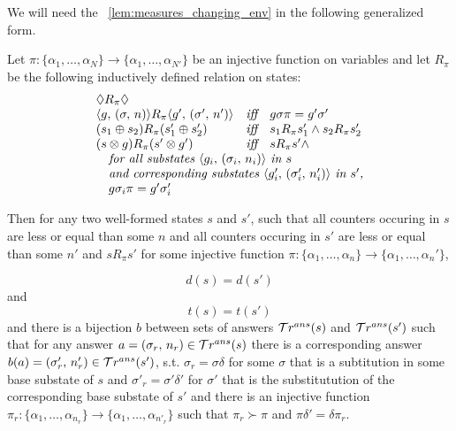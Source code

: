 


We will need the \lemmaword~\ref{lem:measures_changing_env} in the following generalized form.

\begin{lemma}
\label{lem:gen_measures_changing_env}
Let $\pi \colon \{ \alpha_1, \dots, \alpha_N \} \to \{ \alpha_1, \dots, \alpha_{N'} \}$ be an injective function on variables and let $R_{\pi}$ be the following inductively defined relation on states:
\[ \begin{array}{lcl}
\Diamond R_{\pi} \Diamond & & \\
\taskst{g}{\mkenv{\sigma}{n}} R_{\pi} \taskst{g'}{\mkenv{\sigma'}{n'}} & \textit{iff} & g \sigma \pi = g' \sigma' \\
(s_1 \oplus s_2) R_{\pi} (s'_1 \oplus s'_2) & \textit{iff} & s_1 R_{\pi} s'_1 \land s_2 R_{\pi} s'_2  \\
(s \otimes g) R_{\pi} (s' \otimes g') & \textit{iff} & s R_{\pi} s' \land \\
\multicolumn{3}{l}{\textit{\quad for all substates $\taskst{g_i}{\mkenv{\sigma_i}{n_i}}$ in $s$}}\\
\multicolumn{3}{l}{\textit{\quad and corresponding substates $\taskst{g'_i}{\mkenv{\sigma'_i}{n'_i}}$ in $s'$,}} \\
\multicolumn{3}{l}{\quad g \sigma_i \pi = g' \sigma'_i} \\
\end{array} \]

Then for any two well-formed states $s$ and $s'$, such that all counters occuring in $s$ are less or equal than some $n$ and all counters occuring in $s'$ are less or equal than some $n'$ and $s R_{\pi} s'$ for some injective function $\pi \colon \{ \alpha_1, \dots, \alpha_n \} \to \{ \alpha_1, \dots, \alpha_n' \}$,

\[ d(s) = d(s') \]
and \[ t(s) = t(s') \]
and there is a bijection $b$ between sets of answers $\mathcal{T}r^{ans}(s)$ and $\mathcal{T}r^{ans}(s')$ such that for any answer $a = (\sigma_r ,\, n_r) \in \mathcal{T}r^{ans}(s)$ there is a corresponding answer $b(a) = (\sigma'_r ,\, n'_r) \in \mathcal{T}r^{ans}(s')$, s.t. $\sigma_r = \sigma \delta$ for some $\sigma$ that is a subtitution in some base substate of $s$ and $\sigma'_r = \sigma' \delta'$ for $\sigma'$ that is the substitutution of the corresponding base substate of $s'$ and there is an injective function $\pi_r \colon \{ \alpha_1, \dots, \alpha_{n_r} \} \to \{ \alpha_1, \dots, \alpha_{n'_r} \}$ such that $\pi_r \succ \pi$ and $\pi \delta' = \delta \pi_r$.
\end{lemma}
